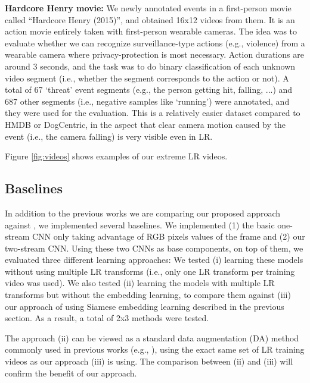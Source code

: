 \documentclass[letterpaper]{article} %
\begin{document}
{\flushleft\textbf{Hardcore Henry movie:} We newly annotated events in a first-person movie called ``Hardcore Henry (2015)'', and obtained 16x12 videos from them. It is an action movie entirely taken with first-person wearable cameras. The idea was to evaluate whether we can recognize surveillance-type actions (e.g., violence) from a wearable camera where privacy-protection is most necessary. Action durations are around 3 seconds, and the task was to do binary classification of each unknown video segment (i.e., whether the segment corresponds to the action or not). A total of 67 `threat' event segments (e.g., the person getting hit, falling, ...) and 687 other segments (i.e., negative samples like `running') were annotated, and they were used for the evaluation. This is a relatively easier dataset compared to HMDB or DogCentric, in the aspect that clear camera motion caused by the event (i.e., the camera falling) is very visible even in LR.}

Figure \ref{fig:videos} shows examples of our extreme LR videos.

\subsection{Baselines}

In addition to the previous works we are comparing our proposed approach against \cite{ryoo17privacy,chen17}, we implemented several baselines. We implemented (1) the basic one-stream CNN only taking advantage of RGB pixels values of the frame and (2) our two-stream CNN. Using these two CNNs as base components, on top of them, we evaluated three different learning approaches: We tested (i) learning these models without using multiple LR transforms (i.e., only one LR transform per training video was used). We also tested (ii) learning the models with multiple LR transforms but without the embedding learning, to compare them against (iii) our approach of using Siamese embedding learning described in the previous section. As a result, a total of 2x3 methods were tested.

The approach (ii) can be viewed as a standard data augmentation (DA) method commonly used in previous works (e.g., \cite{karpathy14}), using the exact same set of LR training videos as our approach (iii) is using. The comparison between (ii) and (iii) will confirm the benefit of our approach.


\end{document}
